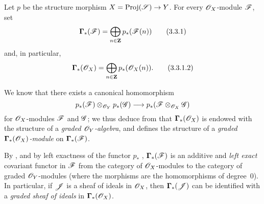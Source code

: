 \begin{env}[3.3.1]
\label{II.3.3.1}
Let $p$ be the structure morphism $X=\Proj(\sh{S})\to Y$.
For every $\mathscr{O}_X$-module $\mathscr{F}$, set
\[
\label{II.3.3.1.1}
  \boldsymbol\Gamma_*(\mathscr{F}) = \bigoplus_{n\in\mathbf{Z}}p_*(\mathscr{F}(n))
\tag{3.3.1}
\]
and, in particular,
\[
\label{II.3.3.1.2}
  \boldsymbol\Gamma_*(\mathscr{O}_X) = \bigoplus_{n\in\mathbf{Z}}p_*(\mathscr{O}_X(n)).
\tag{3.3.1.2}
\]

We know  that there exists a canonical homomorphism
\[
  p_*(\sh{F})\otimes_{\sh{O}_Y}p_*(\sh{G}) \to p_*(\sh{F}\otimes_{\sh{O}_X}\sh{G})
\]
for $\mathscr{O}_X$-modules $\mathscr{F}$ and $\mathscr{G}$;
we thus deduce from  that $\boldsymbol\Gamma_*(\mathscr{O}_X)$ is endowed with the structure of a \emph{graded $\mathscr{O}_Y$-algebra}, and  defines the structure of a \emph{graded $\boldsymbol\Gamma_*(\mathscr{O}_X)$-module} on $\boldsymbol\Gamma_*(\mathscr{F})$.

By , and by left exactness of the functor $p_*$ , $\boldsymbol\Gamma_*(\mathscr{F})$ is an additive and \emph{left exact} covariant functor in $\mathscr{F}$ from the category of $\mathscr{O}_X$-modules to the category of graded $\mathscr{O}_Y$-modules (where the morphisms are the homomorphisms of degree~$0$).
In particular, if $\mathscr{J}$ is a sheaf of ideals in $\mathscr{O}_X$, then $\boldsymbol\Gamma_*(\mathscr{J})$ can be identified with a \emph{graded sheaf of ideals} in $\boldsymbol\Gamma_*(\mathscr{O}_X)$.
\end{env}

